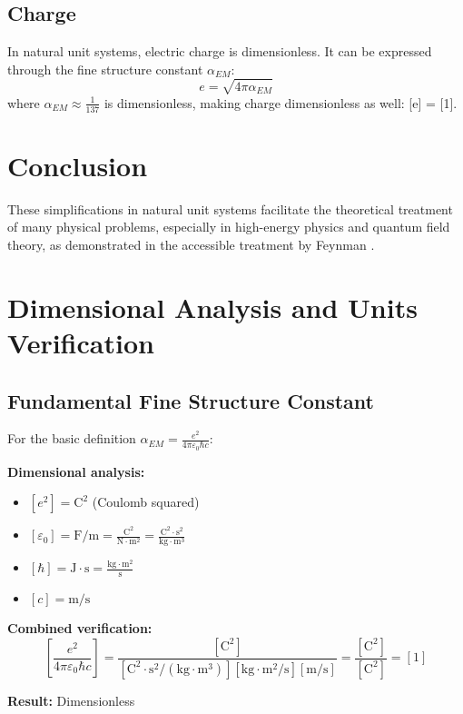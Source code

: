 \documentclass[12pt,a4paper]{article}
\begin{document}
	\subsection{Charge}
	In natural unit systems, electric charge is dimensionless. It can be expressed through the fine structure constant $\alpha_{EM}$:
	\begin{equation}
		e = \sqrt{4\pi\alpha_{EM}}
	\end{equation}
	where $\alpha_{EM} \approx \frac{1}{137}$ is dimensionless, making charge dimensionless as well: [e] = [1].
	
	\section{Conclusion}
	These simplifications in natural unit systems facilitate the theoretical treatment of many physical problems, especially in high-energy physics and quantum field theory, as demonstrated in the accessible treatment by Feynman \cite{Feynman2006}.
	
	
	\section{Dimensional Analysis and Units Verification}
	
	\subsection{Fundamental Fine Structure Constant}
	
	For the basic definition $\alpha_{EM} = \frac{e^2}{4\pi\varepsilon_0\hbar c}$:
	
	\begin{tcolorbox}[colback=blue!5!white,colframe=blue!75!black,title=Units Check: Fine Structure Constant]
		\textbf{Dimensional analysis:}
		\begin{itemize}
			\item $[e^2] = \text{C}^2$ (Coulomb squared)
			\item $[\varepsilon_0] = \text{F/m} = \frac{\text{C}^2}{\text{N}\cdot\text{m}^2} = \frac{\text{C}^2\cdot\text{s}^2}{\text{kg}\cdot\text{m}^3}$
			\item $[\hbar] = \text{J}\cdot\text{s} = \frac{\text{kg}\cdot\text{m}^2}{\text{s}}$
			\item $[c] = \text{m/s}$
		\end{itemize}
		
		\textbf{Combined verification:}
		$$\left[\frac{e^2}{4\pi\varepsilon_0\hbar c}\right] = \frac{[\text{C}^2]}{[\text{C}^2\cdot\text{s}^2/(\text{kg}\cdot\text{m}^3)][\text{kg}\cdot\text{m}^2/\text{s}][\text{m/s}]} = \frac{[\text{C}^2]}{[\text{C}^2]} = [1]$$
		
		\textbf{Result:} Dimensionless \checkmark
	\end{tcolorbox}
	
\end{document}

